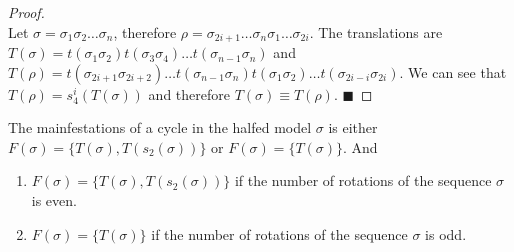 \begin{proof} \phantom{x} \\
	Let $\sigma = \sigma_1\sigma_2 \dots \sigma_n$, therefore $\rho = \sigma_{2i+1} \dots \sigma_n\sigma_1 \dots \sigma_{2i}$.
	The translations are $T(\sigma) = t(\sigma_1\sigma_2)t(\sigma_3\sigma_4) \dots t(\sigma_{n-1}\sigma_n)$
	and $T(\rho) = t(\sigma_{2i+1}\sigma_{2i+2}) \dots t(\sigma_{n-1}\sigma_n)t(\sigma_1\sigma_2) \dots t(\sigma_{2i-i}\sigma_{2i})$.
	We can see that $T(\rho) = s_4^i(T(\sigma))$ and therefore $T(\sigma) \equiv T(\rho)$.
	\hfill $\blacksquare$
\end{proof}

\begin{theorem}
	\label{theorem:coexistence.even}
	The mainfestations of a cycle in the halfed model $\sigma$ is either $F(\sigma) = \{T(\sigma), T(s_2(\sigma))\}$ or $F(\sigma) = \{T(\sigma)\}$.
	And \begin{enumerate}
		\item $F(\sigma) = \{T(\sigma), T(s_2(\sigma))\}$ if the number of rotations of the sequence $\sigma$ is even.
		\item $F(\sigma) = \{T(\sigma)\}$ if the number of rotations of the sequence $\sigma$ is odd.
	\end{enumerate}
\end{theorem}


